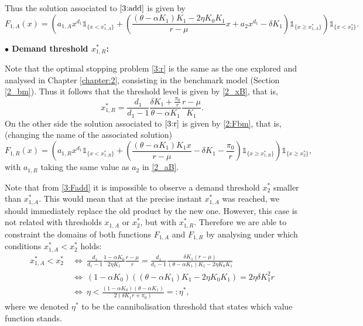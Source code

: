 Thus the solution associated to $\eqref{3:add}$ is given by 
\begin{equation}
F_{1,A}(x)= \left(  a_{1,A}x^{d_1} \mathds{1}_{ \{ x<x^*_{1,A}\}} +
\left(  \frac{(\theta-\alpha K_1)K_1-2 \eta K_0 K_1}{r-\mu} x+
a_2 x^{d_1} - \delta K_1 \right)  \mathds{1}_{ \{ x \geq x^*_{1,A} \}} \right)  \mathds{1}_{ \{   x < x_2^*  \}}.
\label{3:Fadd}
\end{equation}

\textbf{$\bullet$ Demand threshold $x^*_{1,R}$:}

Note that the optimal stopping problem \eqref{3:r} is the same as the one explored and analysed in Chapter \ref{chapter:2}, consisting in the benchmark model (Section \ref{2_bm}).
Thus it follows that the threshold level is given by \eqref{2_xB}, that is,
\begin{equation}
x^*_{1,R}=\frac{d_1}{d_1-1} \frac{ \delta K_1  +\frac{\pi_0}{r} }{\theta-\alpha K_1} \frac{r-\mu}{K_1}.
\label{3_x1R}
\end{equation}
On the other side the solution associated to $\eqref{3:r}$ is given by \eqref{2:Fbm}, that is, (changing the name of the associated solution)
\begin{equation}
F_{1,R}(x)= \left(  a_{1,R}x^{d_1} \mathds{1}_{ \{ x<x^*_{1,R}\}} +
\left(  \frac{(\theta-\alpha K_1)K_1 x}{r-\mu} - \delta K_1  -\frac{\pi_0}{r}\right)  \mathds{1}_{ \{ x \geq x^*_{1,R}\}} \right) \mathds{1}_{ \{ x \geq x^*_2\}} ,
\label{3:Fr}
\end{equation}
with $a_{1,R}$ taking the same value as $a_2$ in \eqref{2_aB}.


Note that from \eqref{3:Fadd} it is impossible to observe a demand threshold $x_2^*$ smaller than $x_{1,A}^*$. This would mean that at the precise instant $x_{1,A}^*$ was reached, we should immediately replace the old product by the new one. However, this case is not related with thresholds $x_{1,A}$ or $x_2^*$, but with $x_{1,R}^*$.
Therefore we are able to constraint the domains of both functions $F_{1,A}$ and $F_{1,R}$ by analysing under which conditions $x_{1,A}^*<x^*_2$ holds:
\begin{align}
x_{1,A}^*<x_2^* \ &\Leftrightarrow \ \frac{d_1}{d_1-1} \frac{1-\alpha K_0}{2 \eta K_1} \frac{r-\mu}{r} = \frac{d_1}{d_1-1} \frac{\delta K_1 (r-\mu)}{(\theta-\alpha K_1)K_1-2\eta K_0 K_1} \nonumber \\
&\Leftrightarrow \ (1-\alpha K_0) ((\theta-\alpha K_1)K_1-2\eta K_0 K_1)=2 \eta \delta K_1^2 r 
 \nonumber \\
&\Leftrightarrow \ \eta <\frac{(1-\alpha K_0)(\theta-\alpha K_1)}{2(\delta K_1 r + \pi_0)}=: \eta^*, \label{3_eta*}
\end{align}
where we denoted $\eta^*$ to be the cannibalisation threshold that states which value function stands.

